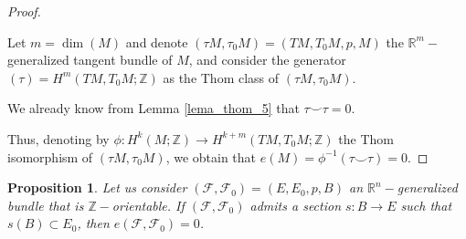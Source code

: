 \documentclass[12pt,oneside]{book}
\newtheorem{prop}   {Proposition}[chapter]
\newcommand{\R}{\mathbb{R}}
\newcommand{\Z}{\mathbb{Z}}
\newcommand{\ccup}{\smile}
\begin{document}
    \begin{proof}

        \

        Let $m = \dim(M)$ and denote $(\tau M,\tau_{0}M) = (TM,T_{0}M,p,M)$ the $\R^{m}-$generalized tangent
        bundle of $M$, and consider the generator $(\tau) = H^{m}(TM,T_{0}M;\Z)$ as the Thom class of 
        $(\tau M,\tau_{0}M)$.

    	We already know from Lemma \ref{lema_thom_5} that $\tau \ccup \tau = 0$.

    	Thus, denoting by $\phi: H^{k}(M;\Z) \to H^{k+m}(TM,T_{0}M;\Z)$ the Thom isomorphism of $(\tau M,\tau_{0}M)$, we obtain that 
        $e(M) = \phi^{-1}(\tau \ccup \tau) = 0$.

    \end{proof}

    \begin{prop}\label{poincare-hopf}
	Let us consider $(\mathcal{F},\mathcal{F}_{0})=(E,E_{0},p,B)$ an $\R^{n}-$generalized bundle that is 
    $\Z-$orientable. If $(\mathcal{F},\mathcal{F}_{0})$ admits a section $s:B\to E$ such that 
    $s(B)\subset E_{0}$, then $e(\mathcal{F},\mathcal{F}_{0})=0$.
    \end{prop}
\end{document}
